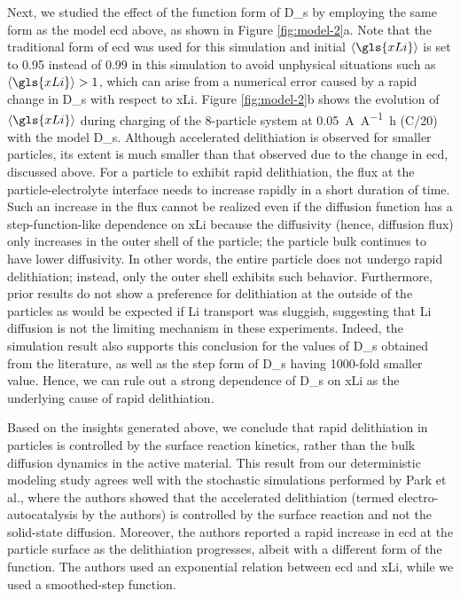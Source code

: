 \documentclass{article}
\begin{document}
Next, we studied the effect of the function form of \gls{D_s} by
employing the same form as the model \gls{ecd} above, as shown in
Figure \ref{fig:model-2}a. Note that the traditional form of \gls{ecd}
was used for this simulation and initial $\left\langle \gls{xLi}
\right\rangle$ is set to \num{0.95} instead of \num{0.99} in this
simulation to avoid unphysical situations such as $\left\langle
\gls{xLi} \right\rangle > 1$, which can arise from a numerical error
caused by a rapid change in \gls{D_s} with respect to
\gls{xLi}. Figure \ref{fig:model-2}b shows the evolution of
$\left\langle \gls{xLi} \right\rangle$ during charging of the
8-particle system at \SI{0.05}{\ampere\per\ampere\hour} (C/20) with
the model \gls{D_s}. Although accelerated delithiation is observed for
smaller particles, its extent is much smaller than that observed due
to the change in \gls{ecd}, discussed above. For a particle to exhibit
rapid delithiation, the flux at the particle-electrolyte interface
needs to increase rapidly in a short duration of time. Such an
increase in the flux cannot be realized even if the diffusion function
has a step-function-like dependence on \gls{xLi} because the
diffusivity (hence, diffusion flux) only increases in the outer shell
of the particle; the particle bulk continues to have lower
diffusivity. In other words, the entire particle does not undergo
rapid delithiation; instead, only the outer shell exhibits such
behavior. Furthermore, prior results do not show a preference for
delithiation at the outside of the particles\cite{lu2021} as would be
expected if Li transport was sluggish, suggesting that Li diffusion is
not the limiting mechanism in these experiments. Indeed, the
simulation result also supports this conclusion for the values of
\gls{D_s} obtained from the literature, as well as the step form of
\gls{D_s} having 1000-fold smaller value. Hence, we can rule out a
strong dependence of \gls{D_s} on \gls{xLi} as the underlying cause of
rapid delithiation.

Based on the insights generated above, we conclude that rapid
delithiation in \nca{} particles is controlled by the surface reaction
kinetics, rather than the bulk  diffusion dynamics in the
active material. This result from our deterministic modeling study
agrees well with the stochastic simulations performed by Park et
al.\cite{chueh2021}, where the authors showed that the accelerated
delithiation (termed electro-autocatalysis by the authors) is
controlled by the surface reaction and not the solid-state
diffusion. Moreover, the authors reported a rapid increase in
\gls{ecd} at the \nca{} particle surface as the delithiation
progresses, albeit with a different form of the function. The authors
used an exponential relation between \gls{ecd} and \gls{xLi}, while we
used a smoothed-step function.
\end{document}
